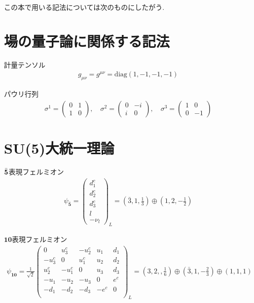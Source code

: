 %
%
この本で用いる記法については次のものにしたがう.
\section{場の量子論に関係する記法}
計量テンソル
\begin{align}
  g_{\mu\nu} = g^{\mu\nu} = \mathrm{diag}(1, -1, -1, -1)
\end{align}

パウリ行列
\begin{align}
  \sigma ^1 = \left(\begin{array}{cc}
        0 & 1 \\
        1 & 0 
      \end{array}\right),\quad
  \sigma ^2 = \left(\begin{array}{cc}
        0 & -i \\
        i &  0 
      \end{array}\right),\quad
  \sigma ^3 = \left(\begin{array}{cc}
        1 & 0 \\
        0 & -1 
      \end{array}\right)
\end{align}

\section{SU(5)大統一理論}

$\bar{\bf{5}}$表現フェルミオン
\begin{align}
  \psi_{\bar{\bm{5}}} =\begin{pmatrix}
    d_1 ^c \\
    d_2 ^c \\
    d_3 ^c \\
    l      \\
    -\nu_l
  \end{pmatrix}_L
  =\left(\bar{3},1,\frac{1}{3}\right)\oplus \left(1,2,-\frac{1}{2}\right)
\end{align}

$\bm{10}$表現フェルミオン
\begin{align}
  \psi_{{\bm{10}}} = \frac{1}{\sqrt{2}}\begin{pmatrix}
         0 &  u_3^c & -u_2^c & u_1 & d_1 \\
    -u_3^c &      0 &  u_1^c & u_2 & d_2 \\
     u_2^c & -u_1^c &      0 & u_3 & d_3 \\
    -u_1   &   -u_2 &   -u_3 &   0 & e^c \\
      -d_1 &   -d_2 &   -d_3 &-e^c &   0 \\
    \end{pmatrix}_L = (3,2,,\frac{1}{6})\oplus(\bar{3},1,-\frac{2}{3})\oplus(1,1,1)
\end{align}

